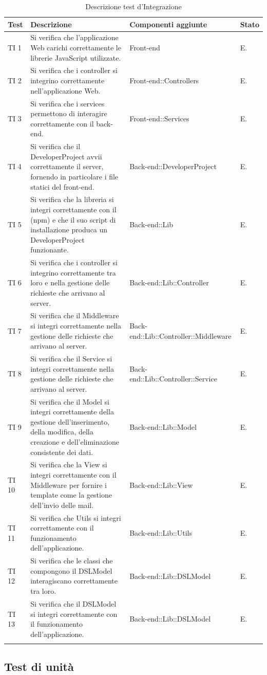 	\bgroup
	\begin{longtable}[H]{|P{1cm}|P{5cm}|P{4.5cm}|P{2cm}|}
		\hline \textbf{Test} & \textbf{Descrizione} & \textbf{Componenti aggiunte} & \textbf{Stato} \\
		
		\hline TI 1 & Si verifica che l'applicazione Web carichi correttamente le librerie JavaScript utilizzate. & Front-end & E. \\
		\hline TI 2 & Si verifica che i controller si integrino correttamente nell'applicazione Web. & Front-end::Controllers & E. \\
		\hline TI 3 & Si verifica che i services permettono di interagire correttamente con il back-end. & Front-end::Services & E. \\
		\hline TI 4 & Si verifica che il DeveloperProject avvii correttamente il server, fornendo in particolare i file statici del front-end. & Back-end::DeveloperProject & E. \\
		\hline TI 5 & Si verifica che la libreria si integri correttamente con il  (npm) e che il suo script di installazione produca un DeveloperProject funzionante. & Back-end::Lib & E. \\
		\hline TI 6 & Si verifica che i controller si integrino correttamente tra loro e nella gestione delle richieste che arrivano al server. & Back-end::Lib::Controller & E. \\
		\hline TI 7 & Si verifica che il Middleware si integri correttamente nella gestione delle richieste che arrivano al server. & Back-end::Lib::Controller::Middleware & E. \\
		\hline TI 8 & Si verifica che il Service si integri correttamente nella gestione delle richieste che arrivano al server. & Back-end::Lib::Controller::Service & E. \\
		\hline TI 9 & Si verifica che il Model si integri correttamente della gestione dell'inserimento, della modifica, della creazione e dell'eliminazione consistente dei dati. & Back-end::Lib::Model & E. \\
		\hline TI 10 & Si verifica che la View si integri correttamente con il Middleware per fornire i template come la gestione dell'invio delle mail. & Back-end::Lib::View & E. \\
		\hline TI 11 & Si verifica che Utils si integri correttamente con il funzionamento dell'applicazione. & Back-end::Lib::Utils & E. \\
		\hline TI 12 & Si verifica che le classi che compongono il DSLModel interagiscano correttamente tra loro. & Back-end::Lib::DSLModel & E. \\
		\hline TI 13 & Si verifica che il DSLModel si integri correttamente con il funzionamento dell'applicazione. & Back-end::Lib::DSLModel & E. \\
		\hline

	\caption{Descrizione test d'Integrazione}
	\end{longtable}
	\egroup
	
	
	\subsection{Test di unità}
	
	
	
	
	

